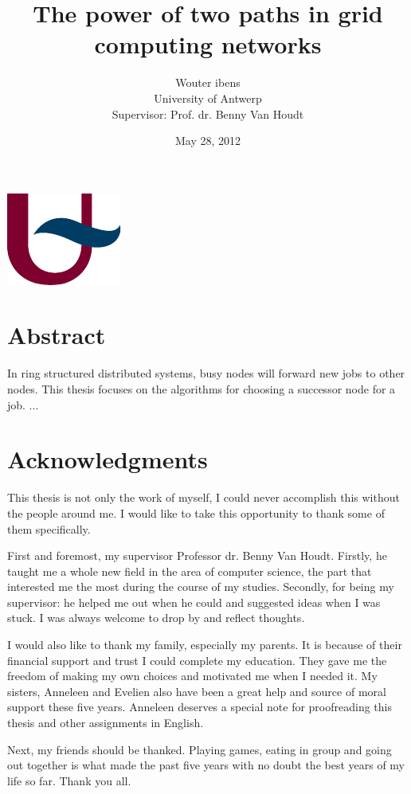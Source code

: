 \documentclass[10pt,a4paper]{article}
\author{Wouter ibens \\ University of Antwerp \\ Supervisor: Prof. dr. Benny Van Houdt}
\title{The power of two paths in grid computing networks}
\date{May 28, 2012}
\begin{document}
\vspace{8em}
\maketitle
\thispagestyle{empty}
\vspace{32em}
\begin{center}
\includegraphics[scale=1.0]{resources/ua.pdf}
\end{center}
\newpage

\section*{Abstract}
In ring structured distributed systems, busy nodes will forward new jobs to other nodes. This thesis focuses on the algorithms for choosing a successor node for a job. ...

\newpage

\section*{Acknowledgments}
This thesis is not only the work of myself, I could never accomplish this without the people around me. I would like to take this opportunity to thank some of them specifically.

First and foremost, my supervisor Professor dr. Benny Van Houdt. Firstly, he taught me a whole new field in the area of computer science, the part that interested me the most during the course of my studies. Secondly, for being my supervisor: he helped me out when he could and suggested ideas when I was stuck. I was always welcome to drop by and reflect thoughts.

I would also like to thank my family, especially my parents. It is because of their financial support and trust I could complete my education. They gave me the freedom of making my own choices and motivated me when I needed it. My sisters, Anneleen and Evelien also have been a great help and source of moral support these five years. Anneleen deserves a special note for proofreading this thesis and other assignments in English.

Next, my friends should be thanked. Playing games, eating in group and going out together is what made the past five years with no doubt the best years of my life so far. Thank you all.
\end{document}
